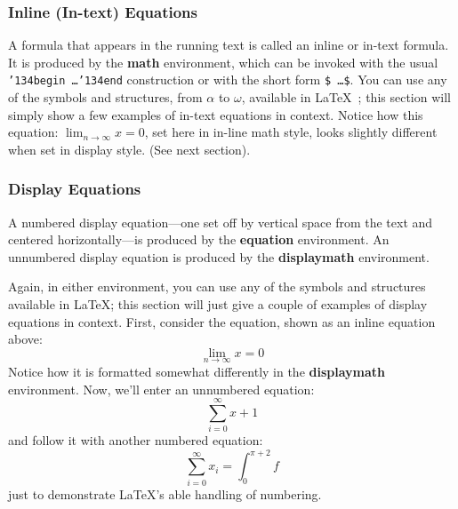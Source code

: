 \subsubsection{Inline (In-text) Equations}
A formula that appears in the running text is called an
inline or in-text formula.  It is produced by the
\textbf{math} environment, which can be
invoked with the usual \texttt{{\char'134}begin\,\ldots{\char'134}end}
construction or with the short form \texttt{\$\,\ldots\$}. You
can use any of the symbols and structures,
from $\alpha$ to $\omega$, available in
\LaTeX~\cite{Lamport:LaTeX}; this section will simply show a
few examples of in-text equations in context. Notice how
this equation:
\begin{math}
  \lim_{n\rightarrow \infty}x=0
\end{math},
set here in in-line math style, looks slightly different when
set in display style.  (See next section).



\subsubsection{Display Equations}
A numbered display equation---one set off by vertical space from the
text and centered horizontally---is produced by the \textbf{equation}
environment. An unnumbered display equation is produced by the
\textbf{displaymath} environment.

Again, in either environment, you can use any of the symbols
and structures available in \LaTeX\@; this section will just
give a couple of examples of display equations in context.
First, consider the equation, shown as an inline equation above:
\begin{equation}
  \lim_{n\rightarrow \infty}x=0
\end{equation}
Notice how it is formatted somewhat differently in
the \textbf{displaymath}
environment.  Now, we'll enter an unnumbered equation:
\begin{displaymath}
  \sum_{i=0}^{\infty} x + 1
\end{displaymath}
and follow it with another numbered equation:
\begin{equation}
  \sum_{i=0}^{\infty}x_i=\int_{0}^{\pi+2} f
\end{equation}
just to demonstrate \LaTeX's able handling of numbering.

